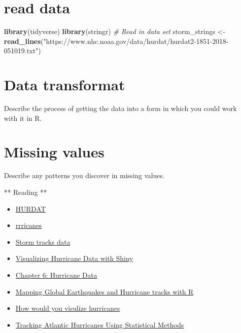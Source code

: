 \documentclass[]{book}
\newenvironment{Shaded}{\begin{snugshade}}{\end{snugshade}}
\newcommand{\CommentTok}[1]{\textcolor[rgb]{0.56,0.35,0.01}{\textit{#1}}}
\newcommand{\KeywordTok}[1]{\textcolor[rgb]{0.13,0.29,0.53}{\textbf{#1}}}
\newcommand{\NormalTok}[1]{#1}
\newcommand{\StringTok}[1]{\textcolor[rgb]{0.31,0.60,0.02}{#1}}
\providecommand{\tightlist}{%
  \setlength{\itemsep}{0pt}\setlength{\parskip}{0pt}}
\begin{document}
\hypertarget{read-data}{%
\section{read data}\label{read-data}}

\begin{Shaded}
\begin{Highlighting}[]
\KeywordTok{library}\NormalTok{(tidyverse)}
\KeywordTok{library}\NormalTok{(stringr)}
\CommentTok{# Read in data set}
\NormalTok{storm_strings <-}\StringTok{ }\KeywordTok{read_lines}\NormalTok{(}\StringTok{"https://www.nhc.noaa.gov/data/hurdat/hurdat2-1851-2018-051019.txt"}\NormalTok{)}
\end{Highlighting}
\end{Shaded}

\hypertarget{data-transformat}{%
\section{Data transformat}\label{data-transformat}}

Describe the process of getting the data into a form in which you could work with it in R.

\hypertarget{missing-values}{%
\section{Missing values}\label{missing-values}}

Describe any patterns you discover in missing values.

** Reading **

\begin{itemize}
\tightlist
\item
  \href{\%22https://cran.r-project.org/web/packages/HURDAT/HURDAT.pdf}{HURDAT}
\item
  \href{\%22https://github.com/ropensci/rrricanes\%22}{rrricanes}
\item
  \href{\%22https://dplyr.tidyverse.org/reference/storms.html\%22}{Storm tracks data}
\item
  \href{\%22https://www.r-bloggers.com/visualizing-hurricane-data-with-shiny/\%22}{Visualizing Hurricane Data with Shiny}
\item
  \href{\%22https://rpubs.com/jelsner/4826\%22}{Chapter 6: Hurricane Data}
\item
  \href{\%22http://david-lallemant.com/mapping-global-earthquakes-and-hurricane-tracks-with-r-2/\%22}{Mapping Global Earthquakes and Hurricane tracks with R}
\item
  \href{\%22http://www.storytellingwithdata.com/blog/2017/10/1/how-youd-visualize-hurricanes\%22}{How would you visulize hurricanes}
\item
  \href{\%22https://scholarcommons.usf.edu/cgi/viewcontent.cgi?article=5927\&context=etd\%22}{Tracking Atlantic Hurricanes Using Statistical Methods}
\end{itemize}
\end{document}
